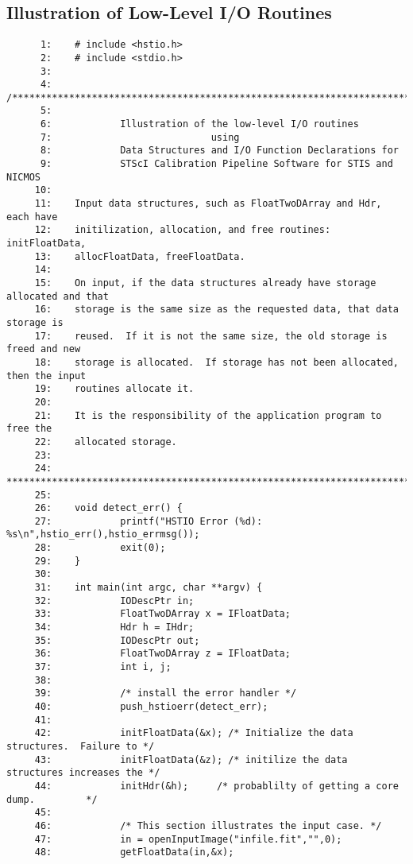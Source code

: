 \subsection{Illustration of Low-Level I/O Routines}
\begin{scriptsize}
\begin{verbatim}
      1:    # include <hstio.h>
      2:    # include <stdio.h>
      3:    
      4:    /***************************************************************************
      5:    
      6:            Illustration of the low-level I/O routines
      7:                            using
      8:            Data Structures and I/O Function Declarations for
      9:            STScI Calibration Pipeline Software for STIS and NICMOS
     10:    
     11:    Input data structures, such as FloatTwoDArray and Hdr, each have
     12:    initilization, allocation, and free routines: initFloatData,
     13:    allocFloatData, freeFloatData. 
     14:    
     15:    On input, if the data structures already have storage allocated and that
     16:    storage is the same size as the requested data, that data storage is
     17:    reused.  If it is not the same size, the old storage is freed and new
     18:    storage is allocated.  If storage has not been allocated, then the input
     19:    routines allocate it. 
     20:    
     21:    It is the responsibility of the application program to free the
     22:    allocated storage. 
     23:    
     24:    ***************************************************************************/
     25:    
     26:    void detect_err() {
     27:            printf("HSTIO Error (%d): %s\n",hstio_err(),hstio_errmsg());
     28:            exit(0);
     29:    }
     30:    
     31:    int main(int argc, char **argv) {
     32:            IODescPtr in;
     33:            FloatTwoDArray x = IFloatData;
     34:            Hdr h = IHdr;
     35:            IODescPtr out;
     36:            FloatTwoDArray z = IFloatData;
     37:            int i, j;
     38:    
     39:            /* install the error handler */
     40:            push_hstioerr(detect_err);
     41:    
     42:            initFloatData(&x); /* Initialize the data structures.  Failure to */
     43:            initFloatData(&z); /* initilize the data structures increases the */
     44:            initHdr(&h);     /* probablilty of getting a core dump.         */
     45:    
     46:            /* This section illustrates the input case. */
     47:            in = openInputImage("infile.fit","",0);
     48:            getFloatData(in,&x);

\end{verbatim}
\end{scriptsize}
